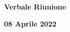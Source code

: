 \begin{center}
  \Huge\textbf{Verbale Riunione}
\end{center}

\begin{center}
  \LARGE\textbf{08 Aprile 2022}
\end{center}

\bigskip
\bigskip
\bigskip
